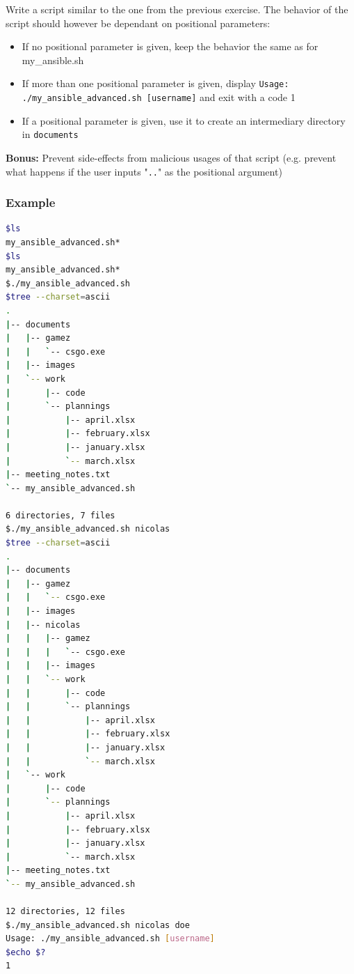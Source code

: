 \documentclass[12pt]{article}
\begin{document}
Write a script similar to the one from the previous exercise. The behavior of the script should however be dependant on positional parameters:

\begin{itemize}
\item If no positional parameter is given, keep the behavior the same as for my\_ansible.sh
\item If more than one positional parameter is given, display \texttt{Usage: ./my\_ansible\_advanced.sh [username]} and exit with a code 1
\item If a positional parameter is given, use it to create an intermediary directory in \texttt{documents}
\end{itemize}

\textbf{Bonus:} Prevent side-effects from malicious usages of that script (e.g. prevent what happens if the user inputs "\texttt{..}" as the positional argument)

\subsubsection{Example}

\begin{lstlisting}[language=bash]
$ls
my_ansible_advanced.sh*
$ls
my_ansible_advanced.sh*
$./my_ansible_advanced.sh 
$tree --charset=ascii
.
|-- documents
|   |-- gamez
|   |   `-- csgo.exe
|   |-- images
|   `-- work
|       |-- code
|       `-- plannings
|           |-- april.xlsx
|           |-- february.xlsx
|           |-- january.xlsx
|           `-- march.xlsx
|-- meeting_notes.txt
`-- my_ansible_advanced.sh

6 directories, 7 files
$./my_ansible_advanced.sh nicolas
$tree --charset=ascii
.
|-- documents
|   |-- gamez
|   |   `-- csgo.exe
|   |-- images
|   |-- nicolas
|   |   |-- gamez
|   |   |   `-- csgo.exe
|   |   |-- images
|   |   `-- work
|   |       |-- code
|   |       `-- plannings
|   |           |-- april.xlsx
|   |           |-- february.xlsx
|   |           |-- january.xlsx
|   |           `-- march.xlsx
|   `-- work
|       |-- code
|       `-- plannings
|           |-- april.xlsx
|           |-- february.xlsx
|           |-- january.xlsx
|           `-- march.xlsx
|-- meeting_notes.txt
`-- my_ansible_advanced.sh

12 directories, 12 files
$./my_ansible_advanced.sh nicolas doe
Usage: ./my_ansible_advanced.sh [username]
$echo $?
1
\end{lstlisting}
\end{document}
